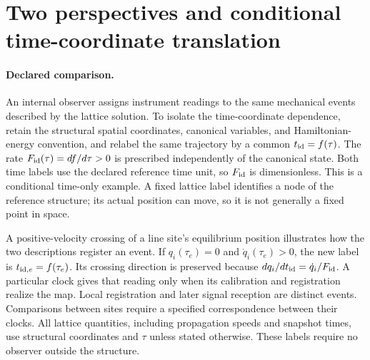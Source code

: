 \documentclass[10pt,aps,onecolumn,notitlepage,nofootinbib]{revtex4-2}
\begin{document}
\clearpage

\section{Two perspectives and conditional time-coordinate translation}
\label{sec:sm-perspectives}

\paragraph*{Declared comparison.}
An internal observer assigns instrument readings to the same mechanical events described by the lattice solution. To isolate the time-coordinate dependence, retain the structural spatial coordinates, canonical variables, and Hamiltonian-energy convention, and relabel the same trajectory by a common $t_{\rm id}=f(\tau)$. The rate $F_{\rm id}(\tau)=df/d\tau>0$ is prescribed independently of the canonical state. Both time labels use the declared reference time unit, so $F_{\rm id}$ is dimensionless. This is a conditional time-only example. A fixed lattice label identifies a node of the reference structure; its actual position can move, so it is not generally a fixed point in space.

A positive-velocity crossing of a line site's equilibrium position illustrates how the two descriptions register an event. If $q_i(\tau_e)=0$ and $\dot q_i(\tau_e)>0$, the new label is $t_{{\rm id},e}=f(\tau_e)$. Its crossing direction is preserved because $dq_i/dt_{\rm id}=\dot q_i/F_{\rm id}$. A particular clock gives that reading only when its calibration and registration realize the map. Local registration and later signal reception are distinct events. Comparisons between sites require a specified correspondence between their clocks. All lattice quantities, including propagation speeds and snapshot times, use structural coordinates and $\tau$ unless stated otherwise. These labels require no observer outside the structure.
\end{document}
